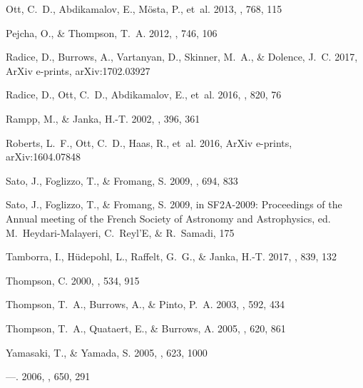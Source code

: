 \documentclass[twocolumn]{aastex6}
\begin{document}
\begin{thebibliography}{}
{Ott}, C.~D., {Abdikamalov}, E., {M{\"o}sta}, P., {et~al.} 2013, \apj, 768, 115

{Pejcha}, O., \& {Thompson}, T.~A. 2012, \apj, 746, 106

{Radice}, D., {Burrows}, A., {Vartanyan}, D., {Skinner}, M.~A., \& {Dolence},
  J.~C. 2017, ArXiv e-prints, arXiv:1702.03927

{Radice}, D., {Ott}, C.~D., {Abdikamalov}, E., {et~al.} 2016, \apj, 820, 76

{Rampp}, M., \& {Janka}, H.-T. 2002, \aap, 396, 361

{Roberts}, L.~F., {Ott}, C.~D., {Haas}, R., {et~al.} 2016, ArXiv e-prints,
  arXiv:1604.07848

{Sato}, J., {Foglizzo}, T., \& {Fromang}, S. 2009{}, \apj, 694, 833

{Sato}, J., {Foglizzo}, T., \& {Fromang}, S. 2009{}, in SF2A-2009:
  Proceedings of the Annual meeting of the French Society of Astronomy and
  Astrophysics, ed. M.~{Heydari-Malayeri}, C.~{Reyl'E}, \& R.~{Samadi}, 175

{Tamborra}, I., {H{\"u}depohl}, L., {Raffelt}, G.~G., \& {Janka}, H.-T. 2017,
  \apj, 839, 132

{Thompson}, C. 2000, \apj, 534, 915

{Thompson}, T.~A., {Burrows}, A., \& {Pinto}, P.~A. 2003, \apj, 592, 434

{Thompson}, T.~A., {Quataert}, E., \& {Burrows}, A. 2005, \apj, 620, 861

{Yamasaki}, T., \& {Yamada}, S. 2005, \apj, 623, 1000

---. 2006, \apj, 650, 291

\end{thebibliography}
\end{document}
